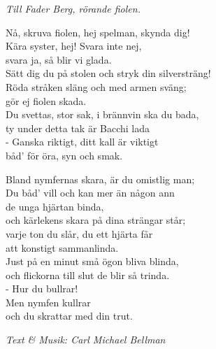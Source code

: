 {\footnotesize\textit{Till Fader Berg, rörande fiolen.}}\par
\vspace{10pt}
Nå, skruva fiolen, hej spelman, skynda dig!\\
Kära syster, hej! Svara inte nej,\\
svara ja, så blir vi glada.\\
Sätt dig du på stolen och stryk din silversträng!\\
Röda stråken släng och med armen sväng;\\
gör ej fiolen skada.\\
Du svettas, stor sak, i brännvin ska du bada,\\
ty under detta tak är Bacchi lada\\
- Ganska riktigt, ditt kall är viktigt\\
båd' för öra, syn och smak.\par
\vspace{10pt}
Bland nymfernas skara, är du omistlig man;\\
Du båd’ vill och kan mer än någon ann\\
de unga hjärtan binda,\\
och kärlekens skara på dina strängar står;\\
varje ton du slår, du ett hjärta får\\
att konstigt sammanlinda.\\
Just på en minut små ögon bliva blinda,\\
och flickorna till slut de blir så trinda.\\
- Hur du bullrar!\\
Men nymfen kullrar\\
och du skrattar med din trut.\par
\vspace{10pt}
{\footnotesize\textit{Text \& Musik: Carl Michael Bellman}}
